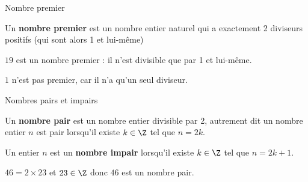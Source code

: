 \begin{pageCours}
%
%

\begin{minipage}{0.5\linewidth}
\begin{DefT}{Nombre premier}

Un \textbf{nombre premier} est un nombre entier naturel qui a exactement 2 diviseurs positifs (qui sont alors 1 et lui-même) 

\end{DefT}
\end{minipage}
\begin{minipage}{0.5\linewidth}
\begin{Ex} 

  $19$ est un nombre premier :  il n'est divisible que par 1 et lui-même.

  $1$ n'est pas premier, car il n'a qu'un seul diviseur.  
\end{Ex}
\end{minipage}


\begin{minipage}{0.5\linewidth}
\begin{DefT}{Nombres pairs et impairs}

  Un \textbf{nombre pair} est un nombre entier divisible par 2, autrement
  dit un nombre entier $n$ est pair lorsqu'il existe $k \in \Z$
  tel que $n=2k$.

  Un entier $n$ est un \textbf{nombre impair} lorsqu'il existe $k \in \Z$
  tel que $n=2k+1$.
\end{DefT}
\end{minipage}
\begin{minipage}{0.5\linewidth}
\begin{Exs} 
$46 = 2 \times 23$ et $23\in\Z$ donc $46$ est un nombre pair.


\end{Exs}
\end{minipage}
\end{pageCours}
